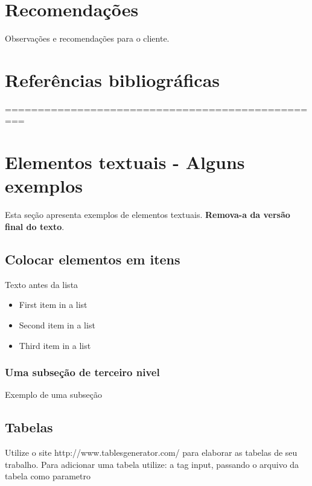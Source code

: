 \documentclass[	DIV=calc,%
							paper=a4,%
							fontsize=12pt,%
							onecolumn]{scrartcl}	 					%
\begin{document}
\section{Recomendações}
Observações e recomendações para o cliente.

\section{Referências bibliográficas}

\renewcommand\refname{} %

  

=================================================
\section{Elementos textuais - Alguns exemplos}

Esta seção apresenta exemplos de elementos textuais. \textbf{Remova-a da versão final do texto}.


\subsection{Colocar elementos em itens}

Texto antes da lista

\begin{itemize}
	\item First item in a list 
	\item Second item in a list 
	\item Third item in a list
\end{itemize}

\subsubsection{Uma subseção de terceiro nivel}

Exemplo de uma subseção

\subsection{Tabelas}

Utilize o site http://www.tablesgenerator.com/ para elaborar as tabelas de seu trabalho.
Para adicionar uma tabela utilize: a tag input, passando o arquivo da tabela como parametro
\end{document}
